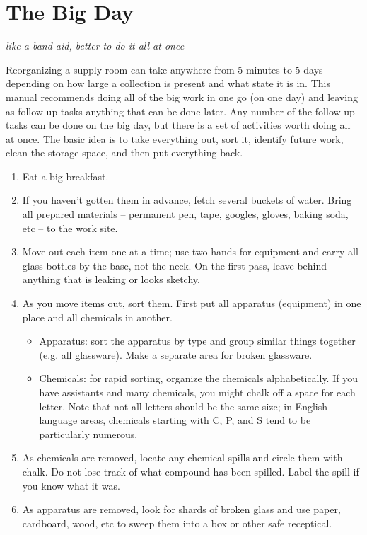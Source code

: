 \section{The Big Day}
\textit{like a band-aid, better to do it all at once}

Reorganizing a supply room can take anywhere from 5 minutes to 5 days depending on how large a collection is present and what state it is in. This manual recommends doing all of the big work in one go (on one day) and leaving as follow up tasks anything that can be done later. Any number of the follow up tasks can be done on the big day, but there is a set of activities worth doing all at once. The basic idea is to take everything out, sort it, identify future work, clean the storage space, and then put everything back. 

\begin{enumerate}
\item{Eat a big breakfast.}
\item{If you haven't gotten them in advance, fetch several buckets of water. Bring all prepared materials -- permanent pen, tape, googles, gloves, baking soda, etc -- to the work site.}
\item{Move out each item one at a time; use two hands for equipment and carry all glass bottles by the base, not the neck. On the first pass, leave behind anything that is leaking or looks sketchy.}
\item{As you move items out, sort them. First put all apparatus (equipment) in one place and all chemicals in another.
\begin{itemize}
\item{Apparatus: sort the apparatus by type and group similar things together (e.g. all glassware). Make a separate area for broken glassware.}
\item{Chemicals: for rapid sorting, organize the chemicals alphabetically. If you have assistants and many chemicals, you might chalk off a space for each letter. Note that not all letters should be the same size; in English language areas, chemicals starting with C, P, and S tend to be particularly numerous.}
\end{itemize}
}
\item{As chemicals are removed, locate any chemical spills and circle them with chalk. Do not lose track of what compound has been spilled. Label the spill if you know what it was.}
\item{As apparatus are removed, look for shards of broken glass and use paper, cardboard, wood, etc to sweep them into a box or other safe receptical.}

\end{enumerate}
